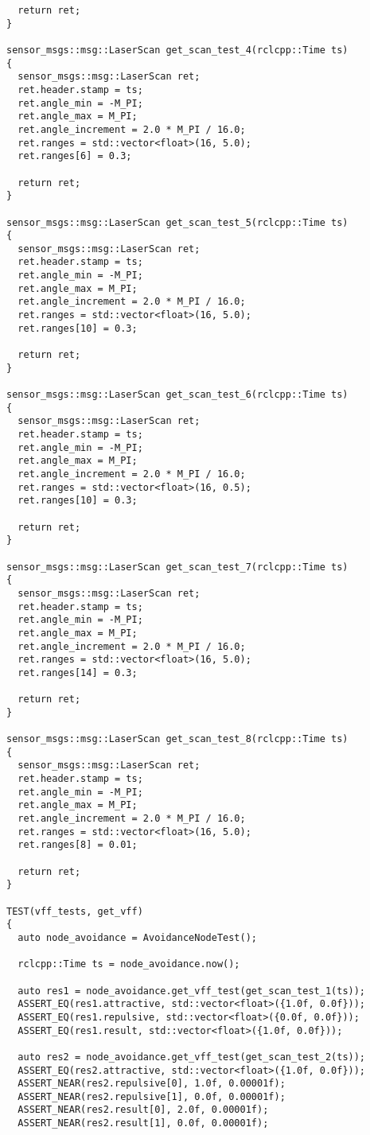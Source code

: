 \begin{tcolorbox}[sharp corners, colframe=gray!80, colback=LightGray, left=0pt, top=0pt, bottom=0pt, title=\texttt{br2\_vff\_avoidance/tests/vff\_test.cpp}]
\begin{verbatim}
  return ret;
}

sensor_msgs::msg::LaserScan get_scan_test_4(rclcpp::Time ts)
{
  sensor_msgs::msg::LaserScan ret;
  ret.header.stamp = ts;
  ret.angle_min = -M_PI;
  ret.angle_max = M_PI;
  ret.angle_increment = 2.0 * M_PI / 16.0;
  ret.ranges = std::vector<float>(16, 5.0);
  ret.ranges[6] = 0.3;

  return ret;
}

sensor_msgs::msg::LaserScan get_scan_test_5(rclcpp::Time ts)
{
  sensor_msgs::msg::LaserScan ret;
  ret.header.stamp = ts;
  ret.angle_min = -M_PI;
  ret.angle_max = M_PI;
  ret.angle_increment = 2.0 * M_PI / 16.0;
  ret.ranges = std::vector<float>(16, 5.0);
  ret.ranges[10] = 0.3;

  return ret;
}

sensor_msgs::msg::LaserScan get_scan_test_6(rclcpp::Time ts)
{
  sensor_msgs::msg::LaserScan ret;
  ret.header.stamp = ts;
  ret.angle_min = -M_PI;
  ret.angle_max = M_PI;
  ret.angle_increment = 2.0 * M_PI / 16.0;
  ret.ranges = std::vector<float>(16, 0.5);
  ret.ranges[10] = 0.3;

  return ret;
}

sensor_msgs::msg::LaserScan get_scan_test_7(rclcpp::Time ts)
{
  sensor_msgs::msg::LaserScan ret;
  ret.header.stamp = ts;
  ret.angle_min = -M_PI;
  ret.angle_max = M_PI;
  ret.angle_increment = 2.0 * M_PI / 16.0;
  ret.ranges = std::vector<float>(16, 5.0);
  ret.ranges[14] = 0.3;

  return ret;
}

sensor_msgs::msg::LaserScan get_scan_test_8(rclcpp::Time ts)
{
  sensor_msgs::msg::LaserScan ret;
  ret.header.stamp = ts;
  ret.angle_min = -M_PI;
  ret.angle_max = M_PI;
  ret.angle_increment = 2.0 * M_PI / 16.0;
  ret.ranges = std::vector<float>(16, 5.0);
  ret.ranges[8] = 0.01;

  return ret;
}

TEST(vff_tests, get_vff)
{
  auto node_avoidance = AvoidanceNodeTest();

  rclcpp::Time ts = node_avoidance.now();

  auto res1 = node_avoidance.get_vff_test(get_scan_test_1(ts));
  ASSERT_EQ(res1.attractive, std::vector<float>({1.0f, 0.0f}));
  ASSERT_EQ(res1.repulsive, std::vector<float>({0.0f, 0.0f}));
  ASSERT_EQ(res1.result, std::vector<float>({1.0f, 0.0f}));

  auto res2 = node_avoidance.get_vff_test(get_scan_test_2(ts));
  ASSERT_EQ(res2.attractive, std::vector<float>({1.0f, 0.0f}));
  ASSERT_NEAR(res2.repulsive[0], 1.0f, 0.00001f);
  ASSERT_NEAR(res2.repulsive[1], 0.0f, 0.00001f);
  ASSERT_NEAR(res2.result[0], 2.0f, 0.00001f);
  ASSERT_NEAR(res2.result[1], 0.0f, 0.00001f);


\end{verbatim}
\end{tcolorbox}
